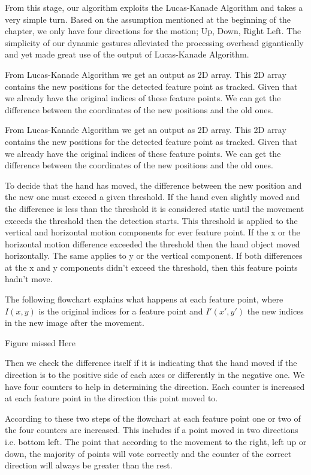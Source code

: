 \documentclass[12pt,fleqn]{book} %
\begin{document}
From this stage, our algorithm exploits the Lucas-Kanade Algorithm and takes a very simple turn. Based on the assumption mentioned at the beginning of the chapter, we only have four directions for the motion; Up, Down, Right Left. The simplicity of our dynamic gestures alleviated the processing overhead gigantically and yet made great use of the output of Lucas-Kanade Algorithm.\bigskip

From Lucas-Kanade Algorithm we get an output as 2D array. This 2D array contains the new positions for the detected feature point as tracked. Given that we already have the original indices of these feature points. We can get the difference between the coordinates of the new positions and the old ones.\bigskip

From Lucas-Kanade Algorithm we get an output as 2D array. This 2D array contains the new positions for the detected feature point as tracked. Given that we already have the original indices of these feature points. We can get the difference between the coordinates of the new positions and the old ones.\bigskip

To decide that the hand has moved, the difference between the new position and the new one must exceed a given threshold. If the hand even slightly moved and the difference is less than the threshold it is considered static until the movement exceeds the threshold then the detection starts. This threshold is applied to the vertical and horizontal motion components for ever feature point. If the x or the horizontal motion difference exceeded the threshold then the hand object moved horizontally. The same applies to y or the vertical component. If both differences at the x and y components didn’t exceed the threshold, then this feature points hadn’t move.\bigskip


The following flowchart explains what happens at each feature point, where $I(x,y)$ is the original indices for a feature point and $I'(x',y')$ the new indices in the new image after the movement. \bigskip

Figure missed Here \bigskip

Then we check the difference itself if it is indicating that the hand moved if the direction is to the positive side of each axes or differently in the negative one. We have four counters to help in determining the direction. Each counter is increased at each feature point in the direction this point moved to.\bigskip


According to these two steps of the flowchart at each feature point one or two of the four counters are increased. This includes if a point moved in two directions i.e. bottom left. The point that according to the movement to the right, left up or down, the majority of points will vote correctly and the counter of the correct direction will always be greater than the rest. \bigskip
\end{document}
